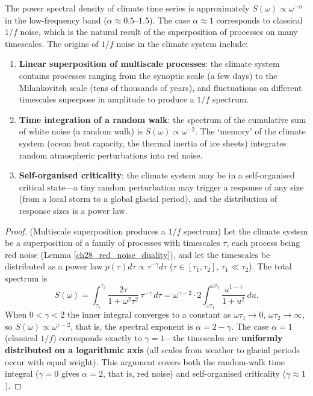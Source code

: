 \begin{proposition}\label{prop:one_over_f_noise}
The power spectral density of climate time series is approximately $S(\omega) \propto \omega^{-\alpha}$ in the low-frequency band ($\alpha \approx 0.5$--$1.5$). The case $\alpha \approx 1$ corresponds to classical $1/f$ noise, which is the natural result of the superposition of processes on many timescales. The origins of $1/f$ noise in the climate system include:
\begin{enumerate}[label=(\roman*)]
    \item \textbf{Linear superposition of multiscale processes}: the climate system contains processes ranging from the synoptic scale (a few days) to the Milankovitch scale (tens of thousands of years), and fluctuations on different timescales superpose in amplitude to produce a $1/f$ spectrum.
    \item \textbf{Time integration of a random walk}: the spectrum of the cumulative sum of white noise (a random walk) is $S(\omega) \propto \omega^{-2}$. The `memory' of the climate system (ocean heat capacity, the thermal inertia of ice sheets) integrates random atmospheric perturbations into red noise.
    \item \textbf{Self-organised criticality}: the climate system may be in a self-organised critical state---a tiny random perturbation may trigger a response of any size (from a local storm to a global glacial period), and the distribution of response sizes is a power law.
\end{enumerate}
\end{proposition}

\begin{proof}
(Multiscale superposition produces a $1/f$ spectrum) Let the climate system be a superposition of a family of processes with timescales $\tau$, each process being red noise (Lemma \ref{ch28_red_noise_duality}), and let the timescales be distributed as a power law $p(\tau)d\tau \propto \tau^{-\gamma}d\tau$ ($\tau \in [\tau_1, \tau_2]$, $\tau_1 \ll \tau_2$). The total spectrum is
\[
S(\omega) = \int_{\tau_1}^{\tau_2} \frac{2\tau}{1+\omega^2\tau^2}\,\tau^{-\gamma}\,d\tau
= \omega^{\gamma-2} \cdot 2\int_{\omega\tau_1}^{\omega\tau_2} \frac{u^{1-\gamma}}{1+u^2}\,du.
\]
When $0 < \gamma < 2$ the inner integral converges to a constant as $\omega\tau_1 \to 0$, $\omega\tau_2 \to \infty$, so $S(\omega) \propto \omega^{\gamma-2}$, that is, the spectral exponent is $\alpha = 2-\gamma$. The case $\alpha = 1$ (classical $1/f$) corresponds exactly to $\gamma = 1$---the timescales are \textbf{uniformly distributed on a logarithmic axis} (all scales from weather to glacial periods occur with equal weight). This argument covers both the random-walk time integral ($\gamma = 0$ gives $\alpha = 2$, that is, red noise) and self-organised criticality ($\gamma \approx 1$).
\end{proof}

